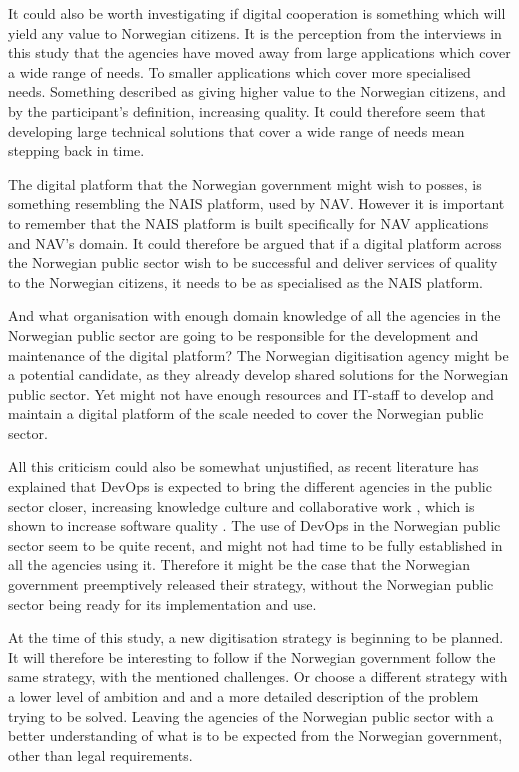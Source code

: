 It could also be worth investigating if digital cooperation is something which will yield any value to Norwegian citizens. It is the perception from the interviews in this study that the agencies have moved away from large applications which cover a wide range of needs. To smaller applications which cover more specialised needs. Something described as giving higher value to the Norwegian citizens, and by the participant's definition, increasing quality. It could therefore seem that developing large technical solutions that cover a wide range of needs mean stepping back in time.

The digital platform that the Norwegian government might wish to posses, is something resembling the NAIS platform, used by NAV. However it is important to remember that the NAIS platform is built specifically for NAV applications and NAV's domain. It could therefore be argued that if a digital platform across the Norwegian public sector wish to be successful and deliver services of quality to the Norwegian citizens, it needs to be as specialised as the NAIS platform. 

And what organisation with enough domain knowledge of all the agencies in the Norwegian public sector are going to be responsible for the development and maintenance of the digital platform? The Norwegian digitisation agency might be a potential candidate, as they already develop shared solutions for the Norwegian public sector. Yet might not have enough resources and IT-staff to develop and maintain a digital platform of the scale needed to cover the Norwegian public sector. 

All this criticism could also be somewhat unjustified, as recent literature has explained that DevOps is expected to bring the different agencies in the public sector closer, increasing knowledge culture and collaborative work \cite{mm_2021}, which is shown to increase software quality \cite{smm_2018}. The use of DevOps in the Norwegian public sector seem to be quite recent, and might not had time to be fully established in all the agencies using it. Therefore it might be the case that the Norwegian government preemptively released their strategy, without the Norwegian public sector being ready for its implementation and use.

At the time of this study, a new digitisation strategy is beginning to be planned. It will therefore be interesting to follow if the Norwegian government follow the same strategy, with the mentioned challenges. Or choose a different strategy with a lower level of ambition and and a more detailed description of the problem trying to be solved. Leaving the agencies of the Norwegian public sector with a better understanding of what is to be expected from the Norwegian government, other than legal requirements.

